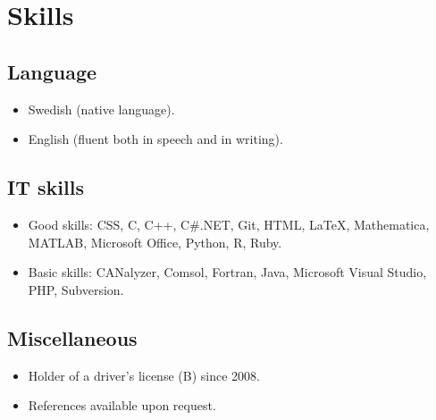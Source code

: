 \documentclass{skvitae}
\begin{document}
	\section{Skills}
	\subsection{Language}
	\begin{itemize}
		\item Swedish (native language).
		\item English (fluent both in speech and in writing).
	\end{itemize}

	\medskip
	\subsection{IT skills}
	\begin{itemize}
		\item Good skills: CSS, C, C++, C\#.NET, Git, HTML, \LaTeX, Mathematica, MATLAB, Microsoft Office, Python, R, Ruby.
		\item Basic skills: CANalyzer, Comsol, Fortran, Java, Microsoft Visual Studio, PHP, Subversion.
	\end{itemize}

	\medskip
	\subsection{Miscellaneous}
	\begin{itemize}
		\item Holder of a driver's license (B) since 2008.
		\item References available upon request.
	\end{itemize}
\end{document}
